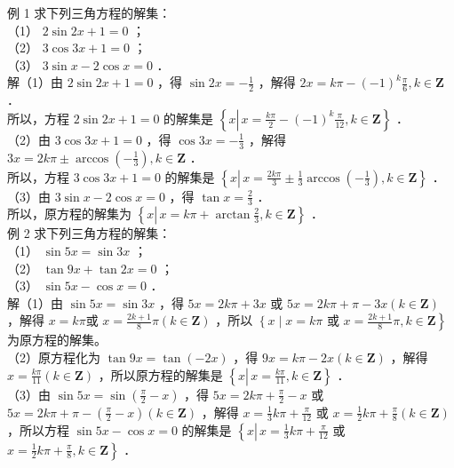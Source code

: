 \documentclass[10pt]{article}
\begin{document}
例 1 求下列三角方程的解集：\\
（1） \(2 \sin 2 x+1=0\) ；\\
（2） \(3 \cos 3 x+1=0\) ；\\
（3） \(3 \sin x-2 \cos x=0\) ．\\
解（1）由 \(2 \sin 2 x+1=0\) ，得 \(\sin 2 x=-\frac{1}{2}\) ，解得 \(2 x=k \pi-(-1)^{k} \frac{\pi}{6}, k \in \mathbf{Z}\) ．\\
所以，方程 \(2 \sin 2 x+1=0\) 的解集是 \(\left\{x \left\lvert\, x=\frac{k \pi}{2}-(-1)^{k} \frac{\pi}{12}\right., k \in \mathbf{Z}\right\}\) ．\\
（2）由 \(3 \cos 3 x+1=0\) ，得 \(\cos 3 x=-\frac{1}{3}\) ，解得 \(3 x=2 k \pi \pm \arccos \left(-\frac{1}{3}\right), k \in \mathbf{Z}\) ．\\
所以，方程 \(3 \cos 3 x+1=0\) 的解集是 \(\left\{x \left\lvert\, x=\frac{2 k \pi}{3} \pm \frac{1}{3} \arccos \left(-\frac{1}{3}\right)\right., k \in \mathbf{Z}\right\}\) ．\\
（3）由 \(3 \sin x-2 \cos x=0\) ，得 \(\tan x=\frac{2}{3}\) ．\\
所以，原方程的解集为 \(\left\{x \left\lvert\, x=k \pi+\arctan \frac{2}{3}\right., k \in \mathbf{Z}\right\}\) ．\\
例 2 求下列三角方程的解集：\\
（1） \(\sin 5 x=\sin 3 x\) ；\\
（2） \(\tan 9 x+\tan 2 x=0\) ；\\
（3） \(\sin 5 x-\cos x=0\) ．\\
解（1）由 \(\sin 5 x=\sin 3 x\) ，得 \(5 x=2 k \pi+3 x\) 或 \(5 x=2 k \pi+\pi-3 x(k \in \mathbf{Z})\) ，解得 \(x=k \pi\)或 \(x=\frac{2 k+1}{8} \pi(k \in \mathbf{Z})\) ，所以 \(\left\{x \mid x=k \pi\right.\) 或 \(\left.x=\frac{2 k+1}{8} \pi, k \in \mathbf{Z}\right\}\) 为原方程的解集。\\
（2）原方程化为 \(\tan 9 x=\tan (-2 x)\) ，得 \(9 x=k \pi-2 x(k \in \mathbf{Z})\) ，解得 \(x=\frac{k \pi}{11}(k \in \mathbf{Z})\) ，所以原方程的解集是 \(\left\{x \left\lvert\, x=\frac{k \pi}{11}\right., k \in \mathbf{Z}\right\}\) ．\\
（3）由 \(\sin 5 x=\sin \left(\frac{\pi}{2}-x\right)\) ，得 \(5 x=2 k \pi+\frac{\pi}{2}-x\) 或 \(5 x=2 k \pi+\pi-\left(\frac{\pi}{2}-x\right)(k \in \mathbf{Z})\) ，解得 \(x=\frac{1}{3} k \pi+\frac{\pi}{12}\) 或 \(x=\frac{1}{2} k \pi+\frac{\pi}{8}(k \in \mathbf{Z})\) ，所以方程 \(\sin 5 x-\cos x=0\) 的解集是 \(\left\{x \left\lvert\, x=\frac{1}{3} k \pi+\frac{\pi}{12}\right.\right.\) 或 \(\left.x=\frac{1}{2} k \pi+\frac{\pi}{8}, k \in \mathbf{Z}\right\}\) ．
\end{document}
